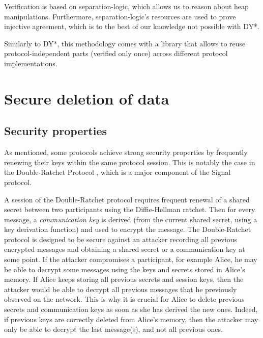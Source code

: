 \documentclass{article}
\begin{document}
Verification is based on separation-logic, which allows us to reason about heap manipulations. Furthermore, separation-logic's resources are used to prove injective agreement, which is to the best of our knowledge not possible with DY*.

Similarly to DY*, this methodology comes with a library that allows to reuse protocol-independent parts (verified only once) across different protocol implementations.

\section{Secure deletion of data}

\subsection{Security properties}

As mentioned, some protocols achieve strong security properties by frequently renewing their keys within the same protocol session. This is notably the case in the Double-Ratchet Protocol \cite{perrin2016double}, which is a major component of the Signal protocol.

A session of the Double-Ratchet protocol requires frequent renewal of a shared secret between two participants using the Diffie-Hellman ratchet.
Then for every message, a \emph{communication key} is derived (from the current shared secret, using a key derivation function) and used to encrypt the message.
The Double-Ratchet protocol is designed to be secure against an attacker recording all previous encrypted messages and obtaining a shared secret or a communication key at some point.
If the attacker compromises a participant, for example Alice, he may be able to decrypt some messages using the keys and secrets stored in Alice's memory. If Alice keeps storing all previous secrets and session keys, then the attacker would be able to decrypt all previous messages that he previously observed on the network. This is why it is crucial for Alice to delete previous secrets and communication keys as soon as she has derived the new ones.
Indeed, if previous keys are correctly deleted from Alice's memory, then the attacker may only be able to decrypt the last message(s), and not all previous ones.
\end{document}
